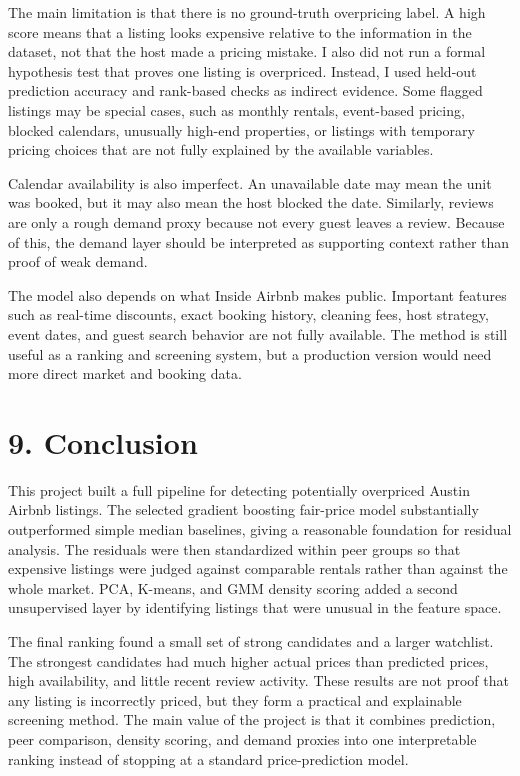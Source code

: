 \documentclass[11pt]{article}
\begin{document}
The main limitation is that there is no ground-truth overpricing label. A high score means that a listing looks expensive relative to the information in the dataset, not that the host made a pricing mistake. I also did not run a formal hypothesis test that proves one listing is overpriced. Instead, I used held-out prediction accuracy and rank-based checks as indirect evidence. Some flagged listings may be special cases, such as monthly rentals, event-based pricing, blocked calendars, unusually high-end properties, or listings with temporary pricing choices that are not fully explained by the available variables.

Calendar availability is also imperfect. An unavailable date may mean the unit was booked, but it may also mean the host blocked the date. Similarly, reviews are only a rough demand proxy because not every guest leaves a review. Because of this, the demand layer should be interpreted as supporting context rather than proof of weak demand.

The model also depends on what Inside Airbnb makes public. Important features such as real-time discounts, exact booking history, cleaning fees, host strategy, event dates, and guest search behavior are not fully available. The method is still useful as a ranking and screening system, but a production version would need more direct market and booking data.

\section*{9. Conclusion}

This project built a full pipeline for detecting potentially overpriced Austin Airbnb listings. The selected gradient boosting fair-price model substantially outperformed simple median baselines, giving a reasonable foundation for residual analysis. The residuals were then standardized within peer groups so that expensive listings were judged against comparable rentals rather than against the whole market. PCA, K-means, and GMM density scoring added a second unsupervised layer by identifying listings that were unusual in the feature space.

The final ranking found a small set of strong candidates and a larger watchlist. The strongest candidates had much higher actual prices than predicted prices, high availability, and little recent review activity. These results are not proof that any listing is incorrectly priced, but they form a practical and explainable screening method. The main value of the project is that it combines prediction, peer comparison, density scoring, and demand proxies into one interpretable ranking instead of stopping at a standard price-prediction model.
\end{document}
